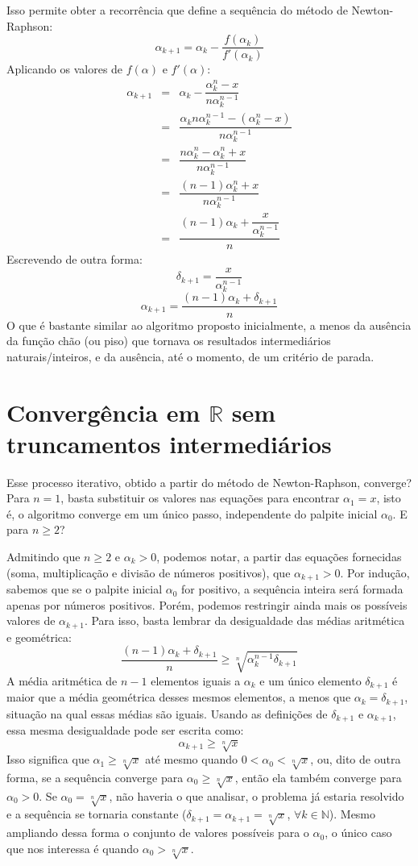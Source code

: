\documentclass{article}
\begin{document}
Isso permite obter a recorrência
que define a sequência do método de Newton-Raphson:
\[\alpha_{k+1} = \alpha_k - \dfrac{f(\alpha_k)}{f'(\alpha_k)}\]
Aplicando os valores de $f(\alpha)$ e $f'(\alpha)$:
\[
  \begin{array}{rcl}
  \alpha_{k+1}
  &=& \alpha_k - \dfrac{\alpha_k^n - x}{n \alpha_k^{n-1}} \\[5mm]
  &=& \dfrac{\alpha_k n \alpha_k^{n-1}
    - (\alpha_k^n - x)}{n \alpha_k^{n-1}} \\[5mm]
  &=& \dfrac{n \alpha_k^n - \alpha_k^n + x}{n \alpha_k^{n-1}} \\[5mm]
  &=& \dfrac{(n-1) \alpha_k^n + x}{n \alpha_k^{n-1}} \\[5mm]
  &=& \dfrac{(n-1) \alpha_k + \dfrac{x}{\alpha_k^{n-1}}}{n}
  \end{array}
\]
Escrevendo de outra forma:
\[\delta_{k+1} = \dfrac{x}{\alpha_k^{n-1}}\]
\[\alpha_{k+1} = \dfrac{(n-1) \alpha_k + \delta_{k+1}}{n}\]
O que é bastante similar ao algoritmo proposto inicialmente,
a menos da ausência da função chão (ou piso)
que tornava os resultados intermediários naturais/inteiros,
e da ausência, até o momento, de um critério de parada.


\section*{Convergência em $\mathds{R}$ sem truncamentos intermediários}

Esse processo iterativo,
obtido a partir do método de Newton-Raphson,
converge?
Para $n = 1$, basta substituir os valores nas equações
para encontrar $\alpha_1 = x$,
isto é, o algoritmo converge em um único passo,
independente do palpite inicial $\alpha_0$.
E para $n \ge 2$?

Admitindo que $n \ge 2$ e $\alpha_k > 0$,
podemos notar, a partir das equações fornecidas
(soma, multiplicação e divisão de números positivos),
que $\alpha_{k+1} > 0$.
Por indução, sabemos que se o palpite inicial $\alpha_0$ for positivo,
a sequência inteira será formada apenas por números positivos.
Porém, podemos restringir ainda mais
os possíveis valores de $\alpha_{k+1}$.
Para isso, basta lembrar
da desigualdade das médias aritmética e geométrica:
\[
  \dfrac{(n-1) \alpha_k + \delta_{k+1}}{n} \ge
  \sqrt[n]{\alpha_k^{n-1} \delta_{k+1}}
\]
A média aritmética de $n-1$ elementos iguais a $\alpha_k$
e um único elemento $\delta_{k+1}$
é maior que a média geométrica desses mesmos elementos,
a menos que $\alpha_k = \delta_{k+1}$,
situação na qual essas médias são iguais.
Usando as definições de $\delta_{k+1}$ e $\alpha_{k+1}$,
essa mesma desigualdade pode ser escrita como:
\[\alpha_{k+1} \ge \sqrt[n]{x}\]
Isso significa que $\alpha_1 \ge \sqrt[n]{x}$
até mesmo quando $0 < \alpha_0 < \sqrt[n]{x}$,
ou, dito de outra forma,
se a sequência converge para $\alpha_0 \ge \sqrt[n]{x}$,
então ela também converge para $\alpha_0 > 0$.
Se $\alpha_0 = \sqrt[n]{x}$, não haveria o que analisar,
o problema já estaria resolvido
e a sequência se tornaria constante
($\delta_{k+1} = \alpha_{k+1} = \sqrt[n]{x}$,
 $\forall k \in \mathds{N}$).
Mesmo ampliando dessa forma
o conjunto de valores possíveis para o $\alpha_0$,
o único caso que nos interessa é quando $\alpha_0 > \sqrt[n]{x}$.
\end{document}
